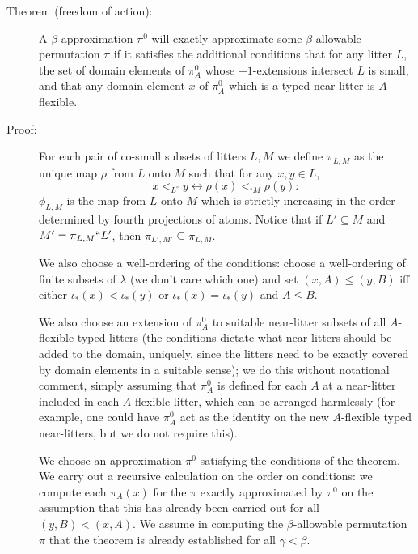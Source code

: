 \documentclass[112pt]{article}
\begin{document}
\begin{description}
\item[Theorem (freedom of action):]  A $\beta$-approximation $\pi^0$ will exactly approximate some $\beta$-allowable permutation $\pi$ if it satisfies the additional conditions that for any litter $L$, the set of domain elements of $\pi^0_A$ whose $-1$-extensions intersect $L$ is small,
and that any domain element $x$ of $\pi^0_A$ which is a typed near-litter is $A$-flexible.

\item[Proof:]   For each pair of co-small subsets of litters $L,M$ we define $\pi_{L,M}$ as the unique map $\rho$ from $L$ onto $M$ such
that for any $x,y \in L$, $$x <_{L^{\circ}} y \leftrightarrow \rho(x) <_{^{\circ}M} \rho(y):$$  $\phi_{L,M}$ is the map from $L$ onto $M$ which is strictly increasing in the order determined by fourth projections of atoms.  Notice that if $L' \subseteq M$ and $M' = \pi_{L,M}``L'$, then $\pi_{L',M'} \subseteq \pi_{L,M}$.

We also choose a well-ordering of the conditions:  choose a well-ordering of finite subsets of $\lambda$ (we don't care which one) and
set $(x,A) \leq (y,B)$ iff either $\iota_*(x) < \iota_*(y)$ or $\iota_*(x) = \iota_*(y)$ and $A \leq B$. 

We also choose an extension of $\pi^0_A$ to suitable near-litter subsets of all $A$-flexible typed litters (the conditions dictate what near-litters should be added to the domain, uniquely, since the litters need to be exactly covered by domain elements in a suitable sense);  we do this without notational comment, simply assuming that $\pi^0_A$ is defined for each $A$ at a near-litter included in each $A$-flexible litter, which can be arranged harmlessly
(for example, one could have $\pi^0_A$ act as the identity on the new $A$-flexible typed near-litters, but we do not require this).

We choose an approximation $\pi^0$ satisfying the conditions of the theorem.  We carry out a recursive calculation on the order on conditions:
we compute each $\pi_A(x)$ for the $\pi$ exactly approximated by $\pi^0$ on the assumption that this has already been carried out for all $(y,B)< (x,A)$.  We assume in computing the $\beta$-allowable permutation $\pi$ that the theorem is already established for all $\gamma<\beta$.


\end{description}
\end{document}
